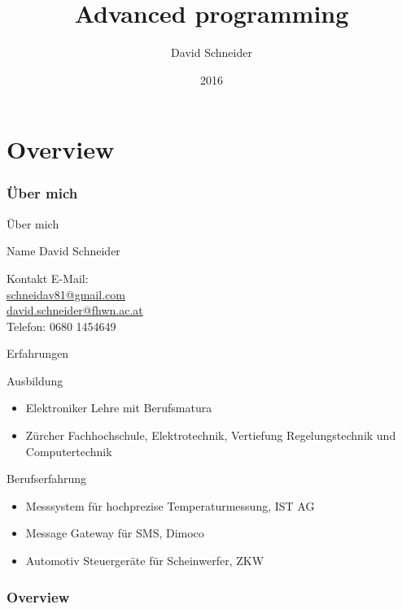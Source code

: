\documentclass{beamer}
\title{Advanced programming}
\author{David Schneider}
\date{2016}
\begin{document}
\frame{\titlepage}

\part{Overview}

\section{Über mich}

\begin{frame}{Über mich}
\begin{block}{Name}
David Schneider
\end{block}

\begin{block}{Kontakt}
E-Mail: \\
\url{schneidav81@gmail.com} \\
\url{david.schneider@fhwn.ac.at} \\
Telefon: 0680 1454649
\end{block}

\end{frame}

\begin{frame}{Erfahrungen}

\begin{block}{Ausbildung}
\begin{itemize}
  \item Elektroniker Lehre mit Berufsmatura
  \item Zürcher Fachhochschule, Elektrotechnik, Vertiefung Regelungstechnik und
Computertechnik
\end{itemize}
\end{block}

\begin{block}{Berufserfahrung}
\begin{itemize}
  \item Messsystem für hochprezise Temperaturmessung, IST AG
  \item Message Gateway für SMS, Dimoco
  \item Automotiv Steuergeräte für Scheinwerfer, ZKW
\end{itemize}
\end{block}

\end{frame}

\section{Overview}
\end{document}
